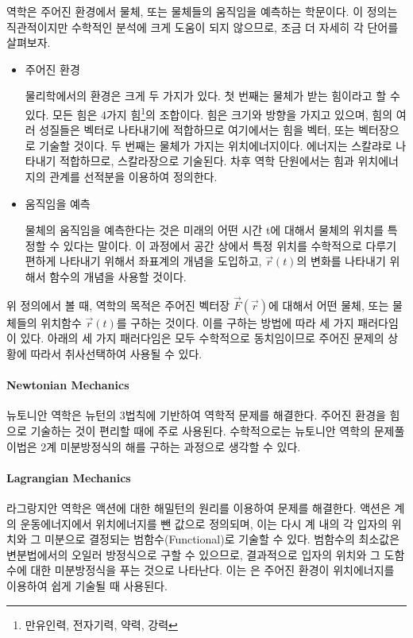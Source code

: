 \documentclass[titlepage]{article}
\begin{document}
역학은 주어진 환경에서 물체, 또는 물체들의 움직임을 예측하는 학문이다. 이 정의는 직관적이지만 수학적인 분석에 크게 도움이 되지 않으므로, 조금 더 자세히 각 단어를 살펴보자. 

\begin{itemize} 
\item 주어진 환경 

물리학에서의 환경은 크게 두 가지가 있다. 첫 번째는 물체가 받는 힘이라고 할 수 있다. 모든 힘은 4가지 힘\footnote{만유인력, 전자기력, 약력, 강력}의 조합이다. 힘은 크기와 방향을 가지고 있으며, 힘의 여러 성질들은 벡터로 나타내기에 적합하므로 여기에서는 힘을 벡터, 또는 벡터장으로 기술할 것이다. 두 번째는 물체가 가지는 위치에너지이다. 에너지는 스칼랴로 나타내기 적합하므로, 스칼라장으로 기술된다. 차후 역학 단원에서는 힘과 위치에너지의 관계를 선적분을 이용하여 정의한다. 

\item 움직임을 예측 

 물체의 움직임을 예측한다는 것은 미래의 어떤 시간 t에 대해서 물체의 위치를 특정할 수 있다는 말이다. 이 과정에서 공간 상에서 특정 위치를 수학적으로 다루기 편하게 나타내기 위해서 좌표계의 개념을 도입하고, $\vec{r}(t)$의 변화를 나타내기 위해서 함수의 개념을 사용할 것이다.
\end{itemize}

위 정의에서 볼 때, 역학의 목적은 주어진 벡터장 $\vec{F}(\vec{r})$에 대해서 어떤 물체, 또는 물체들의 위치함수 $\vec{r}(t)$를 구하는 것이다. 이를 구하는 방법에 따라 세 가지 패러다임이 있다. 아래의 세 가지 패러다임은 모두 수학적으로 동치임이므로 주어진 문제의 상황에 따라서 취사선택하여 사용될 수 있다. 

\paragraph{Newtonian Mechanics}

뉴토니안 역학은 뉴턴의 3법칙에 기반하여 역학적 문제를 해결한다. 주어진 환경을 힘으로 기술하는 것이 편리할 때에 주로 사용된다. 수학적으로는 뉴토니안 역학의 문제풀이법은 2계 미분방정식의 해를 구하는 과정으로 생각할 수 있다. 

\paragraph{Lagrangian Mechanics} 

라그랑지안 역학은 액션에 대한 해밀턴의 원리를 이용하여 문제를 해결한다. 액션은 계의 운동에너지에서 위치에너지를 뺀 값으로 정의되며, 이는 다시 계 내의 각 입자의 위치와 그 미분으로 결정되는 범함수(Functional)로 기술할 수 있다. 범함수의 최소값은 변분법에서의 오일러 방정식으로 구할 수 있으므로, 결과적으로 입자의 위치와 그 도함수에 대한 미분방정식을 푸는 것으로 나타난다. 이는 은 주어진 환경이 위치에너지를 이용하여 쉽게 기술될 때 사용된다. 
\end{document}
